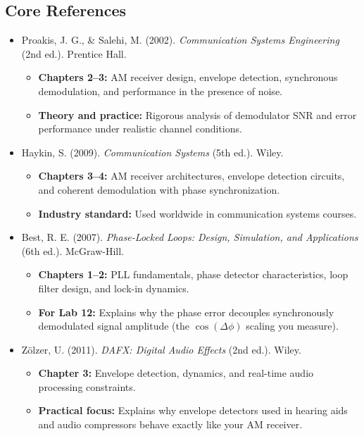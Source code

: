 \documentclass[11pt,letterpaper]{article}
\begin{document}
\subsection*{Core References}

\begin{itemize}
    \item Proakis, J. G., \& Salehi, M. (2002). \textit{Communication Systems Engineering} (2nd ed.). Prentice Hall.
    \begin{itemize}
        \item \textbf{Chapters 2--3:} AM receiver design, envelope detection, synchronous demodulation, and performance in the presence of noise.
        \item \textbf{Theory and practice:} Rigorous analysis of demodulator SNR and error performance under realistic channel conditions.
    \end{itemize}

    \item Haykin, S. (2009). \textit{Communication Systems} (5th ed.). Wiley.
    \begin{itemize}
        \item \textbf{Chapters 3--4:} AM receiver architectures, envelope detection circuits, and coherent demodulation with phase synchronization.
        \item \textbf{Industry standard:} Used worldwide in communication systems courses.
    \end{itemize}

    \item Best, R. E. (2007). \textit{Phase-Locked Loops: Design, Simulation, and Applications} (6th ed.). McGraw-Hill.
    \begin{itemize}
        \item \textbf{Chapters 1--2:} PLL fundamentals, phase detector characteristics, loop filter design, and lock-in dynamics.
        \item \textbf{For Lab 12:} Explains why the phase error decouples synchronously demodulated signal amplitude (the $\cos(\Delta \phi)$ scaling you measure).
    \end{itemize}

    \item Zölzer, U. (2011). \textit{DAFX: Digital Audio Effects} (2nd ed.). Wiley.
    \begin{itemize}
        \item \textbf{Chapter 3:} Envelope detection, dynamics, and real-time audio processing constraints.
        \item \textbf{Practical focus:} Explains why envelope detectors used in hearing aids and audio compressors behave exactly like your AM receiver.
    \end{itemize}


\end{itemize}
\end{document}
